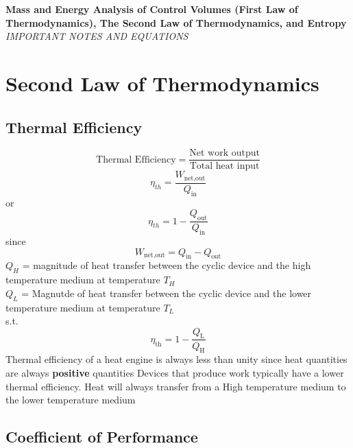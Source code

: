 \documentclass[14pt]{article}
\author{Dylan Garza}
\date
\begin{document}
\begin{titlepage}
   \begin{center}
      \Large\textbf{Mass and Energy Analysis of Control Volumes (First Law of Thermodynamics), The Second Law of Thermodynamics, and Entropy }\\
      \large\textit{IMPORTANT NOTES AND EQUATIONS}
   \end{center}
\end{titlepage}
\section{Second Law of Thermodynamics}
\subsection{Thermal Efficiency}
\begin{equation}
\text{Thermal Efficiency} = \frac{\text{Net work output}}{\text{Total heat input}}
\end{equation}
\begin{equation}
\eta_{th} = \frac{W_{\text{net,out}}}{Q_{\text{in}}}
\end{equation}
or 
\begin{equation}
\eta_{th} = 1 - \frac{Q_{\text{out}}}{Q_{\text{in}}}
\end{equation}
since\begin{equation}
W_{\text{net,out}} = Q_{\text{in}} - Q_{\text{out}}
\end{equation}
$Q_H$ = magnitude of heat transfer between the cyclic device and the high temperature medium at temperature $T_H$
\\
$Q_L$ = Magnutde of heat transfer between the cyclic device and the lower temperature medium at temperature $T_L$
\\
s.t.
\begin{equation}
\eta_{\text{th}} = 1 - \frac{Q_{\text{L}}}{Q_{\text{H}}}
\end{equation}
Thermal efficiency of a heat engine is always less than unity since heat quantities are always \textbf{positive} quantities
Devices that produce work typically have a lower thermal efficiency.
Heat will always transfer from a High temperature medium to the lower temperature medium
\subsection{Coefficient of Performance}
\end{document}
